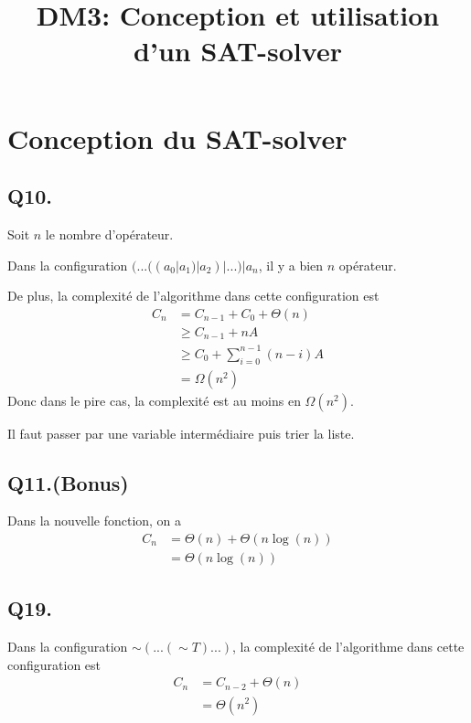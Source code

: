 

\title{DM3: Conception et utilisation d’un SAT-solver}
\author{}
\date{}


    \maketitle
    \section{Conception du SAT-solver}
    \subsection*{Q10.}
    Soit $n$ le nombre d'opérateur.

    Dans la configuration $(...((a_0 | a_1) | a_2) | ...) | a_n$,
    il y a bien $n$ opérateur.

    De plus, la complexité de l'algorithme dans cette configuration est
    \begin{align*}
        C_n &= C_{n-1} + C_0 + \Theta(n)\\
        &\geq C_{n-1} + nA\\
        &\geq C_0 + \sum_{i=0}^{n-1}(n-i)A\\
        &= \Omega(n^2)
    \end{align*}
    Donc dans le pire cas, la complexité est au moins en $\Omega(n^2)$.

    Il faut passer par une variable intermédiaire puis trier la liste.

    \subsection*{Q11.(Bonus)}
    Dans la nouvelle fonction, on a
    \begin{align*}
        C_n &= \Theta(n) + \Theta(n\log(n))\\
        &= \Theta(n\log(n))
    \end{align*}

    \subsection*{Q19.}
    Dans la configuration $\sim(...(\sim T)...)$, 
    la complexité de l'algorithme dans cette configuration est
    \begin{align*}
        C_n &= C_{n-2} + \Theta(n)\\
        &= \Theta(n^2)
    \end{align*}

